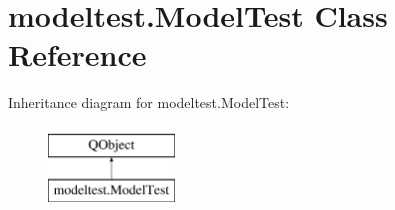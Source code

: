\hypertarget{classmodeltest_1_1ModelTest}{}\section{modeltest.\+Model\+Test Class Reference}
\label{classmodeltest_1_1ModelTest}
Inheritance diagram for modeltest.\+Model\+Test\+:\begin{figure}[H]
\begin{center}
\leavevmode
\includegraphics[height=2.000000cm]{classmodeltest_1_1ModelTest}
\end{center}
\end{figure}
